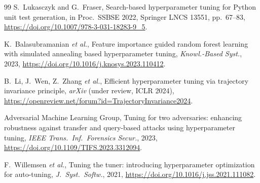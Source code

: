 \documentclass[11pt]{article}
\theoremstyle{definition}
\begin{document}
\begin{thebibliography}{99}
S.~Lukasczyk and G.~Fraser,
Search-based hyperparameter tuning for Python unit test generation,
in Proc.\ SSBSE 2022, Springer LNCS 13551, pp.~67--83,
\url{https://doi.org/10.1007/978-3-031-18283-9_5}.

K.~Balasubramanian \textit{et al.},
Feature importance guided random forest learning with simulated annealing
based hyperparameter tuning,
\textit{Knowl.-Based Syst.}, 2023,
\url{https://doi.org/10.1016/j.knosys.2023.110412}.

B.~Li, J.~Wen, Z.~Zhang \textit{et al.},
Efficient hyperparameter tuning via trajectory invariance principle,
\textit{arXiv} (under review, ICLR 2024),
\url{https://openreview.net/forum?id=TrajectoryInvariance2024}.

Adversarial Machine Learning Group,
Tuning for two adversaries: enhancing robustness against transfer and
query-based attacks using hyperparameter tuning,
\textit{IEEE Trans.\ Inf.\ Forensics Secur.}, 2023,
\url{https://doi.org/10.1109/TIFS.2023.3312094}.

F.~Willemsen \textit{et al.},
Tuning the tuner: introducing hyperparameter optimization for auto-tuning,
\textit{J.\ Syst.\ Softw.}, 2021,
\url{https://doi.org/10.1016/j.jss.2021.111082}.

\end{thebibliography}
\end{document}
